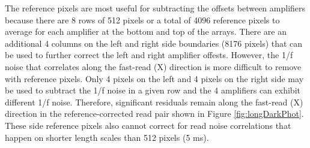 \documentclass[]{aastex62}
\begin{document}
The reference pixels are most useful for subtracting the offsets between amplifiers because there are 8 rows of 512 pixels or a total of 4096 reference pixels to average for each amplifier at the bottom and top of the arrays.
There are an additional 4 columns on the left and right side boundaries (8176 pixels) that can be used to further correct the left and right amplifier offests.
However, the 1/f noise that correlates along the fast-read (X) direction is more difficult to remove with reference pixels.
Only 4 pixels on the left and 4 pixels on the right side may be used to subtract the 1/f noise in a given row and the 4 amplifiers can exhibit different 1/f noise. 
Therefore, significant residuals remain along the fast-read (X) direction in the reference-corrected read pair shown in Figure \ref{fig:longDarkPhot}.
These side reference pixels also cannot correct for read noise correlations that happen on shorter length scales than 512 pixels (5 ms).
\end{document}
